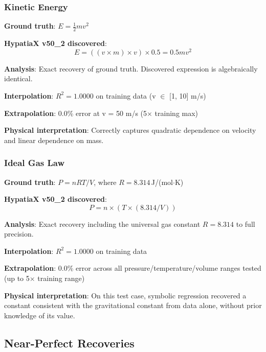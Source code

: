 \documentclass[twoside,11pt]{article}
\begin{document}
\subsubsection{Kinetic Energy}

\begin{example}
\textbf{Ground truth}: $E = \frac{1}{2}mv^2$

\textbf{HypatiaX v50\_2 discovered}:
\begin{equation}
E = ((v \times m) \times v) \times 0.5 = 0.5mv^2
\end{equation}

\textbf{Analysis}: Exact recovery of ground truth. Discovered expression is algebraically identical.

\textbf{Interpolation}: $R^2 = 1.0000$ on training data (v $\in$ [1, 10] m/s)

\textbf{Extrapolation}: 0.0\% error at v = 50 m/s (5$\times$ training max)

\textbf{Physical interpretation}: Correctly captures quadratic dependence on velocity and linear dependence on mass.
\end{example}

\subsubsection{Ideal Gas Law}

\begin{example}
\textbf{Ground truth}: $P = nRT/V$, where $R = 8.314$\,J/(mol$\cdot$K)

\textbf{HypatiaX v50\_2 discovered}:
\begin{equation}
P = n \times (T \times (8.314 / V))
\end{equation}

\textbf{Analysis}: Exact recovery including the universal gas constant $R = 8.314$ to full precision.

\textbf{Interpolation}: $R^2 = 1.0000$ on training data

\textbf{Extrapolation}: 0.0\% error across all pressure/temperature/volume ranges tested (up to 5$\times$ training range)

\textbf{Physical interpretation}: On this test case, symbolic regression recovered a constant consistent with the gravitational constant from data alone, without prior knowledge of its value\citep{lacava2021contemporary}.
\end{example}

\subsection{Near-Perfect Recoveries}
\end{document}
